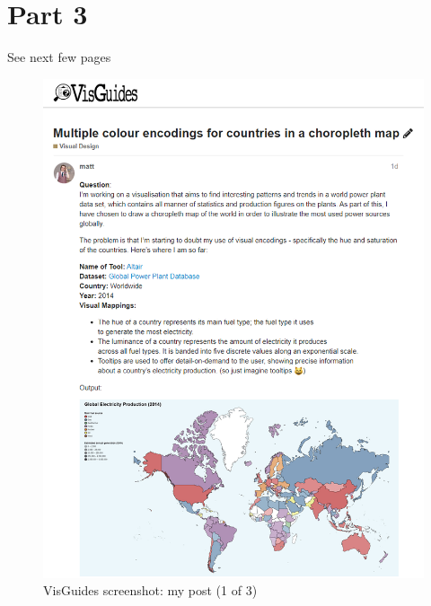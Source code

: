 \hypertarget{part-3}{%
\section{Part 3}\label{part-3}}

See next few pages

\begin{figure}[ht]
    \centering
    \includegraphics[width=\textwidth]{../img/t3_1}
    \caption{VisGuides screenshot: my post (1 of 3)}
\end{figure}
